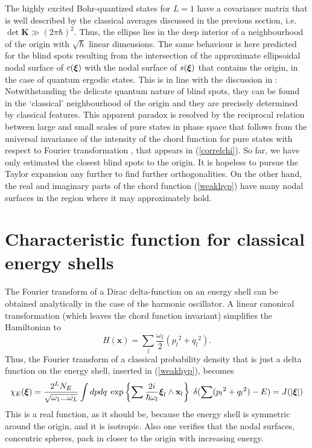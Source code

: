 \documentclass[12pt]{iopart}
\newcommand{\be}{\begin{equation}}
\newcommand{\ee}{\end{equation}}
\newcommand{\x}{{\mathbf x}}
\newcommand{\vct}[1]{\ensuremath\mbox{\boldmath$ #1 $}}
\newcommand{\Vxi}{\vct \xi}
\begin{document}
The highly excited Bohr-quantized states for $L=1$ have a covariance matrix that is well described 
by the classical averages discussed in the previous section, i.e. $\det \mathbf K \gg (2\pi\hbar)^2$. 
Thus, the ellipse  lies in the deep interior of a neighbourhood of the origin 
with $\sqrt{\hbar}$ linear dimensions. The same behaviour is here predicted for the blind
spots resulting from the intersection of the approximate ellipsoidal nodal surface of $c(\Vxi)$
with the nodal surface of $s(\Vxi)$ that contains the origin, in the case of quantum ergodic states.
This is in line with the discussion in \cite{Blind}: Notwithstanding the delicate quantum nature
of blind spots, they can be found in the `classical' neighbourhood of the origin and they
are precisely determined by classical features. This apparent paradox is resolved by
the reciprocal relation between large and small scales of pure states in phase space
that follows from the universal invariance of the intensity of the chord function for pure states
with respect to Fourier transformation \cite{Chountasis, OVS}, that appears in (\ref{correlchi}).
So far, we have only estimated the closest blind spots to the origin. It is hopeless to pursue the Taylor
expansion  any further to find further orthogonalities. On the other hand, 
the real and imaginary parts of the chord function (\ref{weakhyp})
have many nodal surfaces in the region where it may approximately hold.
  






\section{Characteristic function for classical energy shells}

The Fourier transform of a Dirac delta-function on an energy shell can be obtained analytically
in the case of the harmonic oscillator. A linear canonical transformation (which leaves the chord function
invariant) simplifies the Hamiltonian to
\be
H(\x) = \sum_l {\frac{\omega_l}{2}({p_l}^2 + {q_l}^2)}. 
\ee
Thus, the Fourier transform of a classical probability density that is just a delta function on the energy shell,
inserted in (\ref{weakhyp}), becomes
\be
\chi_E(\Vxi)= \frac{2^L N_E}{\sqrt{\omega_1...\omega_L}}\int dpdq \; 
\exp\left\{\sum\frac{2i}{\hbar\omega_l} \Vxi_l\wedge \x_l\right\}\; \delta(\sum ({p_l}^2 +{q_l}^2)-E) = J(|\Vxi|)
\label{HOchi}
\ee
This is a real function, as it should be, because the energy shell is symmetric around the origin,
and it is isotropic. Also one verifies that the nodal surfaces, concentric spheres, 
pack in closer to the origin with increasing energy.
\end{document}
